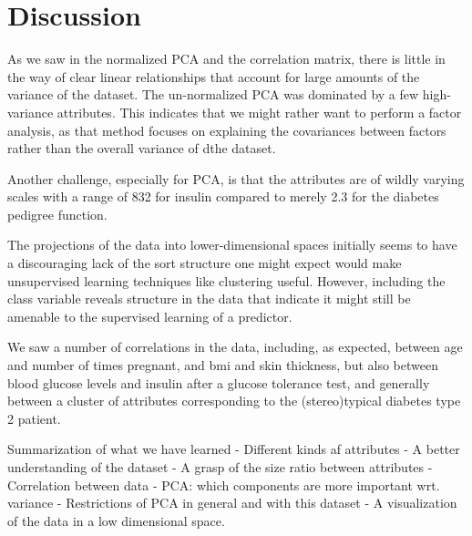 \section{Discussion}
As we saw in the normalized PCA and the correlation matrix,
there is little in the way of clear
linear relationships that account for
large amounts of the variance of the dataset.
The un-normalized PCA was dominated by a few high-variance attributes.
This indicates that we might rather want to perform a factor analysis,
as that method focuses on explaining the covariances between factors rather
than the overall variance of dthe dataset.

Another challenge,
especially for PCA,
is that the attributes are of wildly varying scales
with a range of 832 for insulin compared to merely 2.3
for the diabetes pedigree function.

The projections of the data into lower-dimensional spaces
initially seems to have a discouraging lack of the sort structure
one might expect would make unsupervised learning techniques like clustering useful.
However, including the class variable reveals structure in the data
that indicate it might still be amenable to
the supervised learning of a predictor.

We saw a number of correlations in the data,
including, as expected,
between age and number of times pregnant,
and bmi and skin thickness,
but also between blood glucose levels and insulin after a glucose tolerance test,
and generally between a cluster of attributes corresponding to
the (stereo)typical diabetes type 2 patient.


Summarization of what we have learned
- Different kinds af attributes
- A better understanding of the dataset
- A grasp of the size ratio between attributes
- Correlation between data
- PCA: which components are more important wrt. variance
- Restrictions of PCA in general and with this dataset
- A visualization of the data in a low dimensional space.
